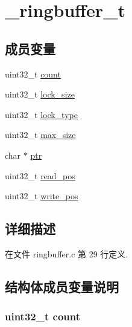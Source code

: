 \hypertarget{struct__ringbuffer__t}{}\section{\+\_\+ringbuffer\+\_\+t}
\label{struct__ringbuffer__t}
\subsection*{成员变量}
\begin{DoxyCompactItemize}
\item 
uint32\+\_\+t \hyperlink{struct__ringbuffer__t_a86988a65e0d3ece7990c032c159786d6}{count}
\item 
uint32\+\_\+t \hyperlink{struct__ringbuffer__t_a84b7e6afd7b5057f5069b5757814d48c}{lock\+\_\+size}
\item 
uint32\+\_\+t \hyperlink{struct__ringbuffer__t_ac857cf0a05d19ede280166517461fde3}{lock\+\_\+type}
\item 
uint32\+\_\+t \hyperlink{struct__ringbuffer__t_a5d749e86bf9e5299c1a5af7bcce2397c}{max\+\_\+size}
\item 
char $\ast$ \hyperlink{struct__ringbuffer__t_a935adc2e417a61d7eb6f04efb18ba031}{ptr}
\item 
uint32\+\_\+t \hyperlink{struct__ringbuffer__t_a7a7c296c9063d85aeecac846c73c2775}{read\+\_\+pos}
\item 
uint32\+\_\+t \hyperlink{struct__ringbuffer__t_ab1cb0fa55deec8b7cfec28fac1f81700}{write\+\_\+pos}
\end{DoxyCompactItemize}


\subsection{详细描述}


在文件 ringbuffer.\+c 第 29 行定义.



\subsection{结构体成员变量说明}
\hypertarget{struct__ringbuffer__t_a86988a65e0d3ece7990c032c159786d6}{}
\subsubsection[{count}]{\setlength{\rightskip}{0pt plus 5cm}uint32\+\_\+t count}\label{struct__ringbuffer__t_a86988a65e0d3ece7990c032c159786d6}


